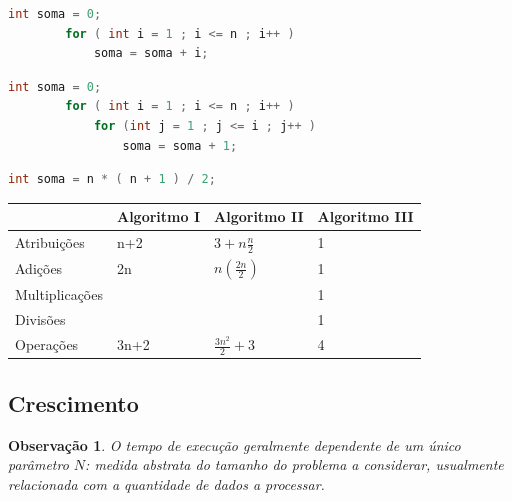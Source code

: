 \documentclass[a4paper, 12pt]{article}
\newtheorem{remark}{Observação}
\begin{document}
\begin{center}
    \begin{lstlisting}[frame=single, language=c, caption=Algoritmo I, captionpos=b]
        int soma = 0;
        for ( int i = 1 ; i <= n ; i++ )
            soma = soma + i;
    \end{lstlisting}
    
    \begin{lstlisting}[frame=single, language=c, caption=Algoritmo II, captionpos=b]
        int soma = 0;
        for ( int i = 1 ; i <= n ; i++ )
            for (int j = 1 ; j <= i ; j++ )
                soma = soma + 1;
    \end{lstlisting}
    
    \begin{lstlisting}[frame=single, language=c, caption=Algoritmo III, captionpos=b]
        int soma = n * ( n + 1 ) / 2;
    \end{lstlisting}
    
    \begin{table}[h]
        \centering
        \begin{tabular}{|l|l|l|l|}
        \hline
                    & Algoritmo I & Algoritmo II       & Algoritmo III \\
        \hline
        Atribuições    & n+2         & $3+n\frac{n}{2}$   & 1             \\
        \hline
        Adições        & 2n          & $n(\frac{2n}{2})$  & 1             \\
        \hline
        Multiplicações &             &                    & 1             \\
        \hline
        Divisões       &             &                    & 1             \\
        \hline
        Operações      & 3n+2        & $\frac{3n^2}{2}+3$ & 4            \\
        \hline
        \end{tabular}
    \end{table}
\end{center}

\subsection{Crescimento}

\begin{remark}
    O tempo de execução geralmente dependente de um único parâmetro $N$: medida abstrata do tamanho do problema a considerar, usualmente relacionada com a quantidade de dados a processar.
\end{remark}
\end{document}
